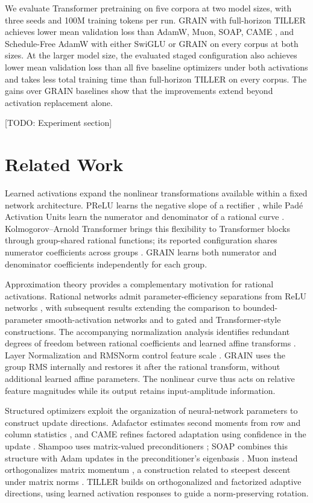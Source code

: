 \documentclass{article}
\begin{document}
We evaluate Transformer pretraining on five corpora at two model sizes,
with three seeds and 100M training tokens per run. GRAIN with
full-horizon TILLER achieves lower mean validation loss than AdamW,
Muon, SOAP, CAME \citep{luo2023came}, and Schedule-Free AdamW
\citep{defazio2024schedulefree} with either SwiGLU or GRAIN
on every corpus at both sizes. At the larger model size, the evaluated
staged configuration also achieves lower mean validation loss than all
five baseline optimizers under
both activations and takes less total training time than full-horizon
TILLER on every corpus. The gains over GRAIN baselines show that the
improvements extend beyond activation replacement alone.

[TODO: Experiment section]

\section{Related Work}

Learned activations expand the nonlinear transformations available within
a fixed network architecture. PReLU learns the negative slope of a
rectifier \citep{he2015rectifiers}, while Pad\'{e} Activation Units learn
the numerator and denominator of a rational curve \citep{molina2020pade}.
Kolmogorov--Arnold Transformer brings this flexibility to Transformer
blocks through group-shared rational functions; its reported
configuration shares numerator coefficients across groups
\citep{yang2025kat}. GRAIN learns both numerator and denominator
coefficients independently for each group.

Approximation theory provides a complementary motivation for rational
activations. Rational networks admit parameter-efficiency separations
from ReLU networks \citep{boulle2020rational}, with subsequent results
extending the comparison to bounded-parameter smooth-activation networks
and to gated and Transformer-style constructions. The accompanying
normalization analysis identifies redundant degrees of freedom between
rational coefficients and learned affine transforms
\citep{tang2026expressivity}. Layer Normalization and
RMSNorm control feature scale \citep{ba2016layer,zhang2019rmsnorm}.
GRAIN uses the group RMS internally and restores it after the rational
transform, without additional learned affine parameters. The nonlinear
curve thus acts on relative feature magnitudes while its output retains
input-amplitude information.

Structured optimizers exploit the organization of neural-network
parameters to construct update directions. Adafactor estimates second
moments from row and column statistics \citep{shazeer2018adafactor}, and
CAME refines factored adaptation using confidence in the update
\citep{luo2023came}. Shampoo uses matrix-valued preconditioners
\citep{gupta2018shampoo}; SOAP combines this structure with Adam updates
in the preconditioner's eigenbasis \citep{vyas2025soap}. Muon instead
orthogonalizes matrix momentum \citep{jordan2024muon,liu2025muon}, a
construction related to steepest descent under matrix norms
\citep{bernstein2024old}. TILLER builds on orthogonalized and factorized
adaptive directions, using learned activation responses to guide a
norm-preserving rotation.
\end{document}
